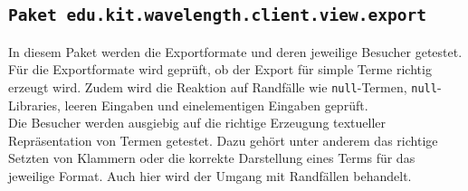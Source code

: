 \documentclass[parskip=full,11pt,twoside]{scrartcl}
\begin{document}
\subsection{\texttt{Paket edu.kit.wavelength.client.view.export}}
In diesem Paket werden die Exportformate und deren jeweilige Besucher getestet.
Für die Exportformate wird geprüft, ob der Export für simple Terme richtig erzeugt wird. Zudem wird die Reaktion auf Randfälle wie \texttt{null}-Termen, \texttt{null}-Libraries, leeren Eingaben und einelementigen Eingaben geprüft.\\
Die Besucher werden ausgiebig auf die richtige Erzeugung textueller Repräsentation von Termen getestet. Dazu gehört unter anderem das richtige Setzten von Klammern oder die korrekte Darstellung eines Terms für das jeweilige Format. Auch hier wird der Umgang mit Randfällen behandelt.
\end{document}
